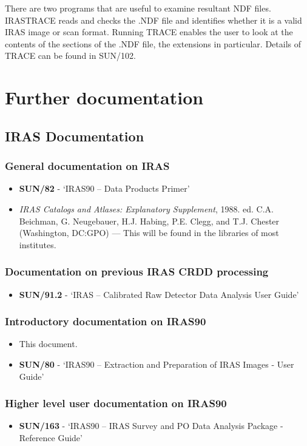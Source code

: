 There are two programs that are useful to examine resultant NDF files.
IRASTRACE reads and checks the .NDF file and identifies whether it is a valid
IRAS image or scan format. Running TRACE enables  the user to look at the
contents of the sections of the .NDF file, the extensions in particular. Details
of TRACE can be found in SUN/102.
\section{Further documentation}
\label{a:docs}
\subsection{IRAS Documentation}
\subsubsection {General documentation on IRAS}
\begin{itemize}
\item {\bf SUN/82} - `IRAS90 -- Data Products Primer' 
\item {\em IRAS Catalogs and Atlases: Explanatory Supplement}, 1988. ed. C.A. 
Beichman, G. Neugebauer, H.J. Habing, P.E. Clegg, and T.J. Chester (Washington,
DC:GPO) --- This will be found in the libraries of most institutes.
\end{itemize}
\subsubsection {Documentation on previous IRAS CRDD processing}
\begin{itemize}
\item {\bf SUN/91.2} - `IRAS -- Calibrated Raw Detector Data Analysis User Guide'
\end{itemize}
\subsubsection {Introductory documentation on IRAS90}
\begin{itemize}
\item This document.
\item {\bf SUN/80} - `IRAS90 -- Extraction and Preparation of IRAS Images - User
Guide'
\end{itemize}
\subsubsection {Higher level user documentation on IRAS90}
\begin{itemize}
\item {\bf SUN/163} - `IRAS90 -- IRAS Survey and PO Data Analysis Package -
Reference Guide'
\end{itemize}
